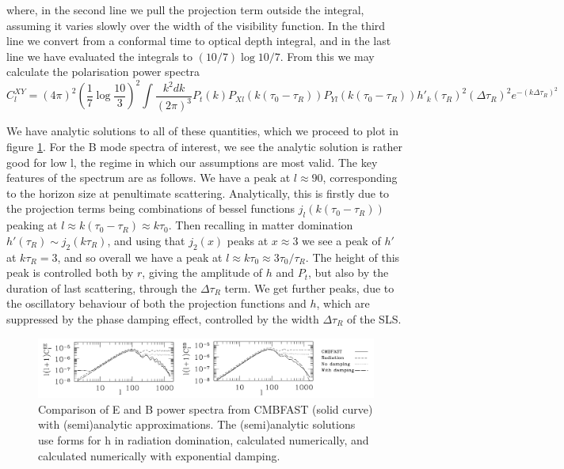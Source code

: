 \documentclass[a4paper,10pt]{article}
\begin{document}
where, in the second line we pull the projection term outside the integral, assuming it varies slowly over the width of the visibility function. In the third line we convert from a conformal time to optical depth integral, and in the last line we have evaluated the integrals to $(10/7)\log{10/7}$. From this we may calculate the polarisation power spectra
\begin{equation}
C_l^{XY} = (4\pi)^2 (\frac{1}{7}\log{\frac{10}{3}})^2 \int \frac{k^2dk}{(2\pi)^3} P_t(k) P_{Xl}(k(\tau_0-\tau_R))P_{Yl}(k(\tau_0-\tau_R))h'_k(\tau_R)^2(\Delta\tau_R)^2e^{-(k\Delta\tau_R)^2}
\end{equation}

We have analytic solutions to all of these quantities, which we proceed to plot in figure \ref{analyticcc}. For the B mode spectra of interest, we see the analytic solution is rather good for low l, the regime in which our assumptions are most valid. The key features of the spectrum are as follows. We have a peak at $l\approx 90$, corresponding to the horizon size at penultimate scattering. Analytically, this is firstly due to the projection terms being combinations of bessel functions $j_l(k(\tau_0-\tau_R))$ peaking at $l\approx k(\tau_0-\tau_R)\approx k\tau_0$. Then recalling in matter domination $h'(\tau_R) \sim j_2(k\tau_R)$, and using that $j_2(x)$ peaks at $x\approx3$ we see a peak of $h'$ at $k\tau_R=3$, and so overall we have a peak at $l\approx k\tau_0\approx 3\tau_0/\tau_R$. The height of this peak is controlled both by $r$, giving the amplitude of $h$ and $P_t$, but also by the duration of last scattering, through the $\Delta\tau_R$ term. We get further peaks, due to the oscillatory behaviour of both the projection functions and $h$, which are suppressed by the phase damping effect, controlled by the width $\Delta\tau_R$ of the SLS. \\

\begin{figure}[h]
\includegraphics[width=\linewidth]{analytic.png}
\centering
\caption{Comparison of E and B power spectra from CMBFAST (solid curve) with (semi)analytic approximations. The (semi)analytic solutions use forms for h in radiation domination, calculated numerically, and calculated numerically  with exponential damping.}
\label{analyticcc}
\end{figure}
\end{document}
